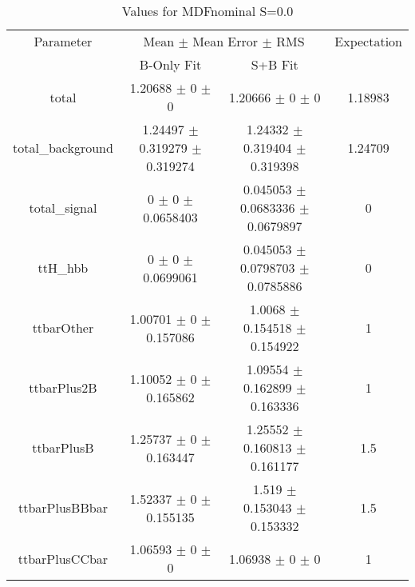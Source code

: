 \begin{table}
\centering
\caption{Values for MDFnominal S=0.0}
\begin{tabular}{cccc}
\toprule
Parameter & \multicolumn{2}{c}{Mean $\pm$ Mean Error $\pm$ RMS} & Expectation\\
 & B-Only Fit & S+B Fit & \\
\midrule
total & \num{1.20688} $\pm$ \num{0} $\pm$ \num{0} & \num{1.20666} $\pm$ \num{0} $\pm$ \num{0} & \num{1.18983}\\
total\_background & \num{1.24497} $\pm$ \num{0.319279} $\pm$ \num{0.319274} & \num{1.24332} $\pm$ \num{0.319404} $\pm$ \num{0.319398} & \num{1.24709}\\
total\_signal & \num{0} $\pm$ \num{0} $\pm$ \num{0.0658403} & \num{0.045053} $\pm$ \num{0.0683336} $\pm$ \num{0.0679897} & \num{0}\\
ttH\_hbb & \num{0} $\pm$ \num{0} $\pm$ \num{0.0699061} & \num{0.045053} $\pm$ \num{0.0798703} $\pm$ \num{0.0785886} & \num{0}\\
ttbarOther & \num{1.00701} $\pm$ \num{0} $\pm$ \num{0.157086} & \num{1.0068} $\pm$ \num{0.154518} $\pm$ \num{0.154922} & \num{1}\\
ttbarPlus2B & \num{1.10052} $\pm$ \num{0} $\pm$ \num{0.165862} & \num{1.09554} $\pm$ \num{0.162899} $\pm$ \num{0.163336} & \num{1}\\
ttbarPlusB & \num{1.25737} $\pm$ \num{0} $\pm$ \num{0.163447} & \num{1.25552} $\pm$ \num{0.160813} $\pm$ \num{0.161177} & \num{1.5}\\
ttbarPlusBBbar & \num{1.52337} $\pm$ \num{0} $\pm$ \num{0.155135} & \num{1.519} $\pm$ \num{0.153043} $\pm$ \num{0.153332} & \num{1.5}\\
ttbarPlusCCbar & \num{1.06593} $\pm$ \num{0} $\pm$ \num{0} & \num{1.06938} $\pm$ \num{0} $\pm$ \num{0} & \num{1}\\
\bottomrule
\end{tabular}
\end{table}